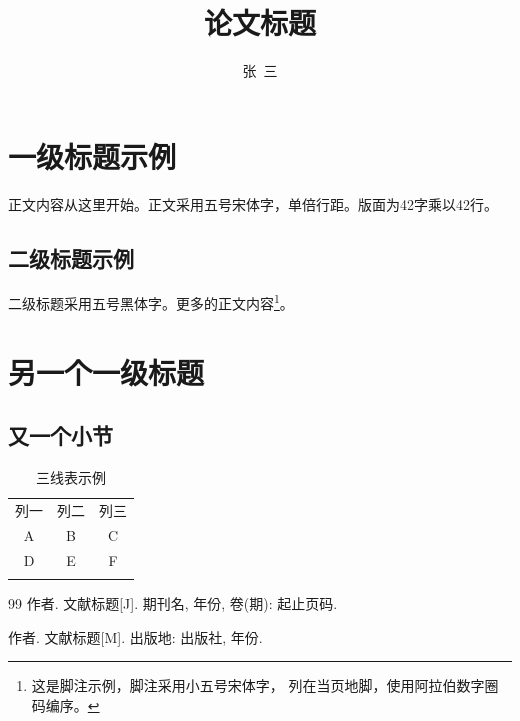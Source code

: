 \documentclass{xmu_course}
\title{论文标题}                                %
\author{张\ 三}                                %
\affiliation{厦门大学\ 人文学院，福建\ 厦门\ 361005}  %
\begin{document}
\makecover

\maketitle
\makefirstpagefooter

\section{一级标题示例}

正文内容从这里开始。正文采用五号宋体字，单倍行距。版面为42字乘以42行。

\subsection{二级标题示例}

二级标题采用五号黑体字。更多的正文内容\footnote{这是脚注示例，脚注采用小五号宋体字，
列在当页地脚，使用阿拉伯数字圈码编序。}。

\section{另一个一级标题}

\subsection{又一个小节}

\begin{table}[htbp]
  \centering
  \caption{三线表示例}
  \label{tab:example}
  \begin{tabular}{@{}ccc@{}}
    \tabletoprule
    列一 & 列二 & 列三 \\
    \tablemidrule
    A & B & C \\
    D & E & F \\
    \tablebottomrule
  \end{tabular}
\end{table}

\begin{thebibliography}{99}
作者. 文献标题[J]. 期刊名, 年份, 卷(期): 起止页码.

作者. 文献标题[M]. 出版地: 出版社, 年份.
\end{thebibliography}

\makeenabstract
\end{document}
